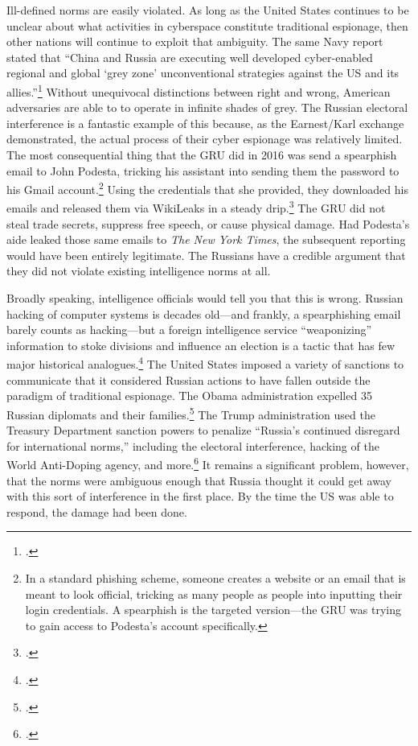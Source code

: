 \documentclass{memoir}
\begin{document}
\begin{refsegment}
Ill-defined norms are easily violated. As long as the United States continues to be unclear about what activities in cyberspace constitute traditional espionage, then other nations will continue to exploit that ambiguity. The same Navy report stated that ``China and Russia are executing well developed cyber-enabled regional and global `grey zone' unconventional strategies against the US and its allies.''\footcite[p.~4]{bayer_cybersecurity_2019} Without unequivocal distinctions between right and wrong, American adversaries are able to to operate in infinite shades of grey. The Russian electoral interference is a fantastic example of this because, as the Earnest/Karl exchange demonstrated, the actual process of their cyber espionage was relatively limited. The most consequential thing that the GRU did in 2016 was send a spearphish email to John Podesta, tricking his assistant into sending them the password to his Gmail account.\footnote{In a standard phishing scheme, someone creates a website or an email that is meant to look official, tricking as many people as people into inputting their login credentials. A spearphish is the targeted version---the GRU was trying to gain access to Podesta's account specifically.} Using the credentials that she provided, they downloaded his emails and released them via WikiLeaks in a steady drip.\footcite{nakashima_how_2018} The GRU did not steal trade secrets, suppress free speech, or cause physical damage. Had Podesta's aide leaked those same emails to \emph{The New York Times}, the subsequent reporting would have been entirely legitimate. The Russians have a credible argument that they did not violate existing intelligence norms at all.

Broadly speaking, intelligence officials would tell you that this is wrong. Russian hacking of computer systems is decades old---and frankly, a spearphishing email barely counts as hacking---but a foreign intelligence service ``weaponizing'' information to stoke divisions and influence an election is a tactic that has few major historical analogues.\footcite{nakashima_how_2018} The United States imposed a variety of sanctions to communicate that it considered Russian actions to have fallen outside the paradigm of traditional espionage. The Obama administration expelled 35 Russian diplomats and their families.\footcite{mazzetti_game_2016} The Trump administration used the Treasury Department sanction powers to penalize ``Russia’s continued disregard for international norms,'' including the electoral interference, hacking of the World Anti-Doping agency, and more.\footcite{department_of_the_treasury_treasury_2018} It remains a significant problem, however, that the norms were ambiguous enough that Russia thought it could get away with this sort of interference in the first place. By the time the US was able to respond, the damage had been done.


\end{refsegment}
\end{document}
